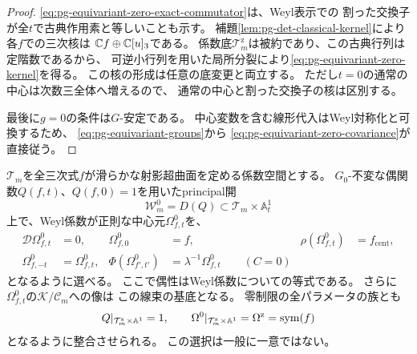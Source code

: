\begin{proof}
\eqref{eq:pg-equivariant-zero-exact-commutator}は、Weyl表示での
割った交換子が全$t$で古典作用素と等しいことも示す。
補題\ref{lem:pg-det-classical-kernel}により各$f$での三次核は
$\mathbb C f\oplus\mathbb C[u]_3$である。
係数底$\mathcal T_m^{\mathrm z}$は被約であり、この古典行列は定階数であるから、
可逆小行列を用いた局所分裂により\eqref{eq:pg-equivariant-zero-kernel}を得る。
この核の形成は任意の底変更と両立する。
ただし$t=0$の通常の中心は次数三全体へ増えるので、
通常の中心と割った交換子の核は区別する。

最後に$g=0$の条件は$G$-安定である。
中心変数を含む線形代入はWeyl対称化と可換するため、
\eqref{eq:pg-equivariant-groups}から
\eqref{eq:pg-equivariant-zero-covariance}が直接従う。
\end{proof}

\begin{theorem}[還元的部分群に関する中心元の同変選択]
\label{thm:pg-equivariant-levi-center}
$\mathcal T_m$を全三次式$f$が滑らかな射影超曲面を定める係数空間とする。
$G_0$-不変な偶関数$Q(f,t)$、$Q(f,0)=1$を用いたprincipal開
\begin{equation}
 \mathcal W_m^0=D(Q)\subset\mathcal T_m\times\mathbb A^1_t
 \label{eq:pg-equivariant-levi-open}
\end{equation}
上で、Weyl係数が正則な中心元$\Omega^0_{f,t}$を、
\begin{equation}
 \begin{aligned}
 \mathcal D\Omega^0_{f,t}&=0,&
 \Omega^0_{f,0}&=f,&
 \rho(\Omega^0_{f,t})&=f_{\mathrm{cent}},\\
 \Omega^0_{f,-t}&=\Omega^0_{f,t},&
 \Phi(\Omega^0_{f',t'})&=\lambda^{-1}\Omega^0_{f,t}\qquad(C=0)
 \end{aligned}
 \label{eq:pg-equivariant-levi-center}
\end{equation}
となるように選べる。
ここで偶性はWeyl係数についての等式である。
さらに$\Omega^0_{f,t}$の$\mathcal K/\mathcal C_m$への像は
この線束の基底となる。
零制限の全パラメータの族とも
\begin{equation}
 Q|_{\mathcal T_m^{\mathrm z}\times\mathbb A^1}=1,
 \qquad
 \Omega^0|_{\mathcal T_m^{\mathrm z}\times\mathbb A^1}
 =\Omega^{\mathrm z}=\operatorname{sym}(f)
 \label{eq:pg-equivariant-levi-zero-compatibility}
\end{equation}
となるように整合させられる。
この選択は一般に一意ではない。
\end{theorem}
